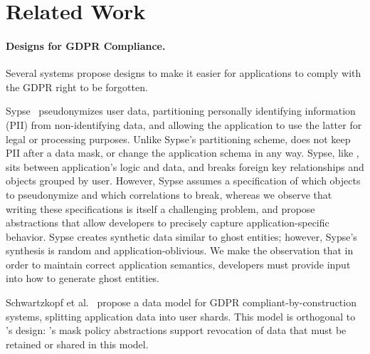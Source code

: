 \section{Related Work}
\label{sec:related}

\paragraph{Designs for GDPR Compliance.}
Several systems propose designs to make it easier for applications to comply with the GDPR right to
be forgotten.

Sypse~\cite{sypse} pseudonymizes user data, partitioning personally identifying information (PII)
from non-identifying data, and allowing the application to use the latter for legal or processing
purposes. 
Unlike Sypse's partitioning scheme, \sys does not keep PII after a data mask, or change the
application schema in any way.
Sypse, like \sys, sits between application's logic and data, and breaks
foreign key relationships and objects grouped by user. However, Sypse assumes a specification of
which objects to pseudonymize and which correlations to break, whereas we observe that writing these
specifications is itself a challenging problem, and propose abstractions that allow developers to
precisely capture application-specific behavior. 
Sypse creates synthetic data similar to ghost entities; however,
Sypse's synthesis is random and application-oblivious. We make the observation that in order to maintain correct application semantics, developers must provide input into how to generate ghost entities.


Schwartzkopf et al.~\cite{usershards} propose a data model for GDPR compliant-by-construction
systems, splitting application data into user shards. This model is orthogonal to \sys's design:
\sys's mask policy abstractions support revocation of data that must be retained or shared in this
model.

